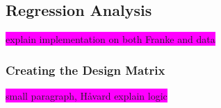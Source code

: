 \documentclass[aps,pra,english,notitlepage,reprint,nofootinbib]{revtex4-1}  %
\begin{document}





\subsection{Regression Analysis}
\colorbox{magenta}{explain implementation on both Franke and data}
\subsubsection{Creating the Design Matrix}
\colorbox{magenta}{small paragraph, Håvard explain logic}
\end{document}
